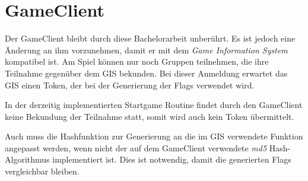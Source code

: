 \section{GameClient} \label{sec:GameClient}
Der GameClient bleibt durch diese Bachelorarbeit unberührt. Es ist jedoch eine Änderung an ihm vorzunehmen, damit er mit dem \textit{Game Information System} kompatibel ist.
Am Spiel können nur noch Gruppen teilnehmen, die ihre Teilnahme gegenüber dem GIS bekunden. Bei dieser Anmeldung erwartet das GIS einen Token, der bei der Generierung der Flags verwendet wird. 

In der derzeitig implementierten Startgame Routine findet durch den GameClient keine Bekundung der Teilnahme statt, somit wird auch kein Token übermittelt.

Auch muss die Hashfunktion zur Generierung an die im GIS verwendete Funktion angepasst werden, wenn nicht der auf dem GameClient verwendete \textit{md5} Hash-Algorithmus implementiert ist. Dies ist notwendig, damit die generierten Flags vergleichbar bleiben.